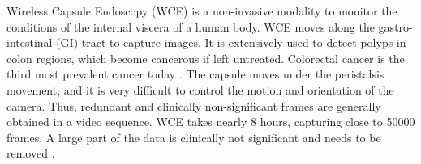 \documentclass[journal]{IEEEtran}
\begin{document}
%
%
%
%

Wireless Capsule Endoscopy (WCE) is a non-invasive modality to monitor the conditions of the internal viscera of a human body. WCE moves along the gastro-intestinal (GI) tract to capture images. It is extensively used to detect polyps in colon regions, which become cancerous if left untreated. Colorectal cancer is the third most prevalent cancer today \cite{siegel2017colorectal}. The capsule moves under the peristalsis movement, and it is very difficult to control the motion and orientation of the camera. Thus, redundant and clinically non-significant frames are generally obtained in a video sequence. 
WCE takes nearly 8 hours, capturing close to 50000 frames.
A large part of the data is clinically not significant and needs to be removed \cite{lee2013reducing}.
\end{document}
